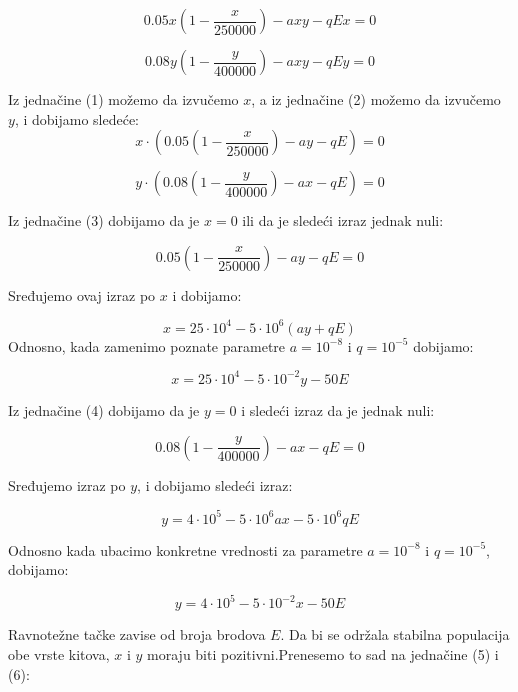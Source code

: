\documentclass[a4paper]{article}
\begin{document}
{	\setcounter{equation}{0}
	\begin{equation}
		0.05x(1 - \frac{x}{250000}) - axy - qEx = 0
	\end{equation}
	
	
	\begin{equation}
		0.08y(1 - \frac{y}{400000}) - axy - qEy = 0
	\end{equation}
	
	Iz jednačine (1) možemo da izvučemo $x$, a iz jednačine (2) možemo da izvučemo $y$, i dobijamo sledeće:\\
	
	\begin{equation}
		x \cdot (0.05(1 - \frac{x}{250000}) - ay - qE) = 0
	\end{equation}

	\begin{equation}
		y \cdot (0.08(1 - \frac{y}{400000}) - ax - qE) = 0
	\end{equation}
	
	Iz jednačine (3) dobijamo da je $x = 0$ ili da je sledeći izraz jednak nuli:
	
	\[
		0.05(1 - \frac{x}{250000}) - ay - qE = 0
	\]
	
	Sređujemo ovaj izraz po $x$ i dobijamo:
	
	\[
		x = 25 \cdot 10^{4} - 5\cdot 10^{6}(ay + qE)
	\]
	Odnosno, kada zamenimo poznate parametre $a = 10^{-8}$ i $q = 10^{-5}$ dobijamo:
	
	\begin{equation}
		x = 25 \cdot 10^{4} - 5 \cdot 10^{-2} y - 50E
	\end{equation}

	Iz jednačine (4) dobijamo da je $y = 0$ i sledeći izraz da je jednak nuli:
	
	\[
		0.08(1 - \frac{y}{400000}) - ax - qE = 0
	\]
	
	Sređujemo izraz po $y$, i dobijamo sledeći izraz:
	
	\[
		y = 4 \cdot 10^{5} - 5 \cdot 10^{6} ax - 5 \cdot 10^{6} qE
	\]
	
	Odnosno kada ubacimo konkretne vrednosti za parametre $a = 10^{-8}$ i $q = 10^{-5}$, dobijamo:
	
	\begin{equation}
		y = 4 \cdot 10^{5} - 5 \cdot 10^{-2} x - 50E
	\end{equation}

	Ravnotežne tačke zavise od broja brodova $E$. Da bi se održala stabilna populacija obe vrste kitova, $x$ i $y$ moraju biti pozitivni.Prenesemo to sad na jednačine (5) i (6):
	
}
\end{document}
